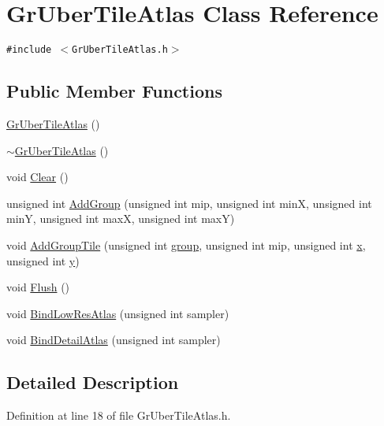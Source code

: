 \hypertarget{class_gr_uber_tile_atlas}{
\section{GrUberTileAtlas Class Reference}
\label{class_gr_uber_tile_atlas}
}
{\tt \#include $<$GrUberTileAtlas.h$>$}

\subsection*{Public Member Functions}
\begin{CompactItemize}
\item 
\hyperlink{class_gr_uber_tile_atlas_d03b6d95afc54589b9597609332bdfc2}{GrUberTileAtlas} ()
\item 
\hyperlink{class_gr_uber_tile_atlas_d24d286ddf5e7dba79b7151ab9e5dbd3}{$\sim$GrUberTileAtlas} ()
\item 
void \hyperlink{class_gr_uber_tile_atlas_8b0b949e6e74b518ae4469afd10d89a9}{Clear} ()
\item 
unsigned int \hyperlink{class_gr_uber_tile_atlas_2defe5d25753145f86eb53f26424f91c}{AddGroup} (unsigned int mip, unsigned int minX, unsigned int minY, unsigned int maxX, unsigned int maxY)
\item 
void \hyperlink{class_gr_uber_tile_atlas_9faf8c4dffaac3e9903aacc01f2ad90e}{AddGroupTile} (unsigned int \hyperlink{wglext_8h_69cec9b28d037f2272131b4fcd148620}{group}, unsigned int mip, unsigned int \hyperlink{wglext_8h_d77deca22f617d3f0e0eb786445689fc}{x}, unsigned int \hyperlink{wglext_8h_9298c7ad619074f5285b32c6b72bfdea}{y})
\item 
void \hyperlink{class_gr_uber_tile_atlas_7f8f26f18099306cc92e8646319a9586}{Flush} ()
\item 
void \hyperlink{class_gr_uber_tile_atlas_9dbe98672876ba6634bd3a7e83f55183}{BindLowResAtlas} (unsigned int sampler)
\item 
void \hyperlink{class_gr_uber_tile_atlas_a0d04de78e4271c4f8cadd25b2a3b022}{BindDetailAtlas} (unsigned int sampler)
\end{CompactItemize}


\subsection{Detailed Description}


Definition at line 18 of file GrUberTileAtlas.h.

